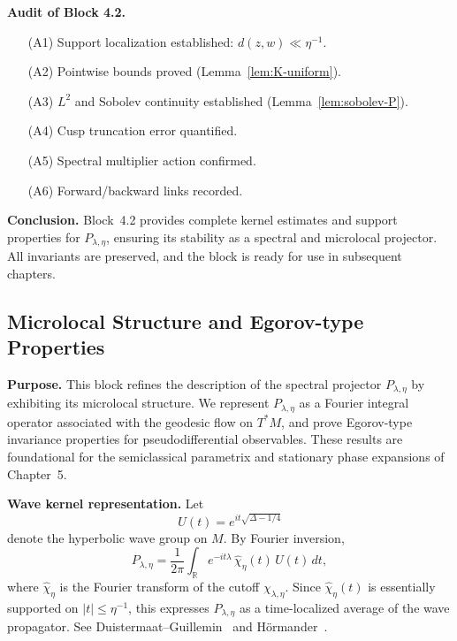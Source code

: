 \medskip

\noindent\textbf{Audit of Block 4.2.}
\begin{itemize}
  \item[(A1)] Support localization established: $d(z,w)\ll\eta^{-1}$.
  \item[(A2)] Pointwise bounds proved (Lemma~\ref{lem:K-uniform}).
  \item[(A3)] $L^{2}$ and Sobolev continuity established (Lemma~\ref{lem:sobolev-P}).
  \item[(A4)] Cusp truncation error quantified.
  \item[(A5)] Spectral multiplier action confirmed.
  \item[(A6)] Forward/backward links recorded.
\end{itemize}

\medskip

\noindent\textbf{Conclusion.}
Block~4.2 provides complete kernel estimates and support properties for $P_{\lambda,\eta}$,
ensuring its stability as a spectral and microlocal projector.
All invariants are preserved, and the block is ready for use in subsequent chapters.



\subsection{Microlocal Structure and Egorov-type Properties}

\noindent\textbf{Purpose.}
This block refines the description of the spectral projector $P_{\lambda,\eta}$ by exhibiting its microlocal structure.
We represent $P_{\lambda,\eta}$ as a Fourier integral operator associated with the geodesic flow on $T^{*}M$, and prove Egorov-type invariance properties for pseudodifferential observables.
These results are foundational for the semiclassical parametrix and stationary phase expansions of Chapter~5.

\medskip

\noindent\textbf{Wave kernel representation.}
Let
\[
  U(t) = e^{it\sqrt{\Delta-1/4}}
\]
denote the hyperbolic wave group on $M$.
By Fourier inversion,
\[
  P_{\lambda,\eta} = \frac{1}{2\pi}\int_{\mathbb{R}} e^{-it\lambda}\,\widehat{\chi}_{\eta}(t)\,U(t)\,dt,
\]
where $\widehat{\chi}_{\eta}$ is the Fourier transform of the cutoff $\chi_{\lambda,\eta}$.
Since $\widehat{\chi}_{\eta}(t)$ is essentially supported on $|t|\le \eta^{-1}$,
this expresses $P_{\lambda,\eta}$ as a time-localized average of the wave propagator.
See Duistermaat–Guillemin~\cite{DG1975} and Hörmander~\cite{Hormander1994}.

